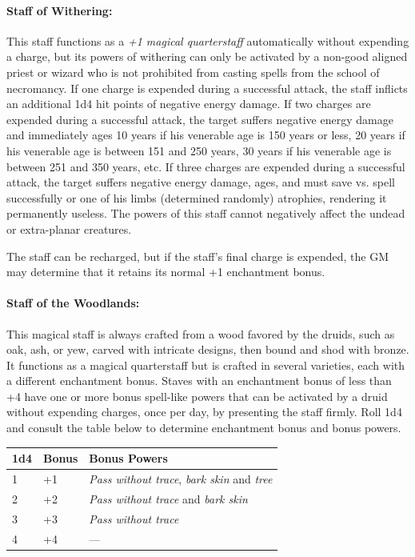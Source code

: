 \begin{multicols}{2}
\paragraph{Staff of Withering:} This staff functions as a \textit{+1 magical quarterstaff} automatically without expending a charge, but its powers of withering can only be activated by a non-good aligned priest or wizard who is not prohibited from casting spells from the school of necromancy.   If one charge is expended during a successful attack, the staff inflicts an additional 1d4 hit points of negative energy damage.  If two charges are expended during a successful attack, the target suffers negative energy damage and immediately ages 10 years if his venerable age is 150 years or less, 20 years if his venerable age is between 151 and 250 years, 30 years if his venerable age is between 251 and 350 years, etc.  If three charges are expended during a successful attack, the target suffers negative energy damage, ages, and must save vs. spell successfully or one of his limbs (determined randomly) atrophies, rendering it permanently useless.  The powers of this staff cannot negatively affect the undead or extra-planar creatures.

The staff can be recharged, but if the staff's final charge is expended, the GM may determine that it retains its normal +1 enchantment bonus.

\paragraph{Staff of the Woodlands:} This magical staff is always crafted from a wood favored by the druids, such as oak, ash, or yew, carved with intricate designs, then bound and shod with bronze.  It functions as a magical quarterstaff but is crafted in several varieties, each with a different enchantment bonus.  Staves with an enchantment bonus of less than +4 have one or more bonus spell-like powers that can be activated by a druid without expending charges, once per day, by presenting the staff firmly.  Roll 1d4 and consult the table below to determine enchantment bonus and bonus powers.

\noindent
\begin{tabular}{|p{}|p{}|p{}|}
\hline
1d4	& Bonus	& Bonus Powers \\
\hline\hline
\rowcolor[gray]{.9}1	& +1	& \textit{Pass without trace}, \textit{bark skin} and \textit{tree} \\
2	& +2	& \textit{Pass without trace} and \textit{bark skin} \\
\rowcolor[gray]{.9}3	& +3	& \textit{Pass without trace} \\
4	& +4	& --- \\
\hline
\end{tabular}


\end{multicols}
